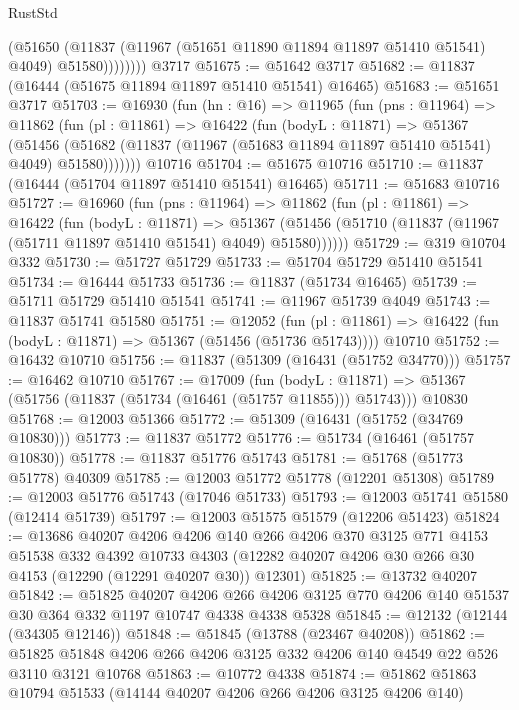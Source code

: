 \begin{lexlean}{RustStd}
\begin{coremodule}
{\begin{coremodule}
{{{{{{{{{{{{{{{{{{{{{{{{{{{{{{{{{{{{{{{{{{{{{{{{{{                (@51650
                  (@11837 (@11967 (@51651 @11890 @11894 @11897 @51410 @51541) @4049) @51580))))))))
    @3717
@51675 := @51642 @3717
@51682 := @11837 (@16444 (@51675 @11894 @11897 @51410 @51541) @16465)
@51683 := @51651 @3717
@51703 := @16930
    (fun (hn : @16) =>
    @11965
      (fun (pns : @11964) =>
      @11862
        (fun (pl : @11861) =>
        @16422
          (fun (bodyL : @11871) =>
          @51367
            (@51456
              (@51682 (@11837 (@11967 (@51683 @11894 @11897 @51410 @51541) @4049) @51580)))))))
    @10716
@51704 := @51675 @10716
@51710 := @11837 (@16444 (@51704 @11897 @51410 @51541) @16465)
@51711 := @51683 @10716
@51727 := @16960
    (fun (pns : @11964) =>
    @11862
      (fun (pl : @11861) =>
      @16422
        (fun (bodyL : @11871) =>
        @51367 (@51456 (@51710 (@11837 (@11967 (@51711 @11897 @51410 @51541) @4049) @51580))))))
@51729 := @319 @10704 @332
@51730 := @51727 @51729
@51733 := @51704 @51729 @51410 @51541
@51734 := @16444 @51733
@51736 := @11837 (@51734 @16465)
@51739 := @51711 @51729 @51410 @51541
@51741 := @11967 @51739 @4049
@51743 := @11837 @51741 @51580
@51751 := @12052
    (fun (pl : @11861) => @16422 (fun (bodyL : @11871) => @51367 (@51456 (@51736 @51743))))
    @10710
@51752 := @16432 @10710
@51756 := @11837 (@51309 (@16431 (@51752 @34770)))
@51757 := @16462 @10710
@51767 := @17009
    (fun (bodyL : @11871) => @51367 (@51756 (@11837 (@51734 (@16461 (@51757 @11855))) @51743)))
    @10830
@51768 := @12003 @51366
@51772 := @51309 (@16431 (@51752 (@34769 @10830)))
@51773 := @11837 @51772
@51776 := @51734 (@16461 (@51757 @10830))
@51778 := @11837 @51776 @51743
@51781 := @51768 (@51773 @51778) @40309
@51785 := @12003 @51772 @51778 (@12201 @51308)
@51789 := @12003 @51776 @51743 (@17046 @51733)
@51793 := @12003 @51741 @51580 (@12414 @51739)
@51797 := @12003 @51575 @51579 (@12206 @51423)
@51824 := @13686
    @40207
    @4206
    @4206
    @140
    @266
    @4206
    @370
    @3125
    @771
    @4153
    @51538
    @332
    @4392
    @10733
    @4303
    (@12282 @40207 @4206 @30 @266 @30 @4153 (@12290 (@12291 @40207 @30)) @12301)
@51825 := @13732 @40207
@51842 := @51825
    @40207
    @4206
    @266
    @4206
    @3125
    @770
    @4206
    @140
    @51537
    @30
    @364
    @332
    @1197
    @10747
    @4338
    @4338
    @5328
@51845 := @12132 (@12144 (@34305 @12146))
@51848 := @51845 (@13788 (@23467 @40208))
@51862 := @51825 @51848 @4206 @266 @4206 @3125 @332 @4206 @140 @4549 @22 @526 @3110 @3121 @10768
@51863 := @10772 @4338
@51874 := @51862 @51863 @10794 @51533 (@14144 @40207 @4206 @266 @4206 @3125 @4206 @140)
}}}}}}}}}}}}}}}}}}}}}}}}}}}}}}}}}}}}}}}}}}}}}}}}}}
\end{coremodule}}
\end{coremodule}
\end{lexlean}
